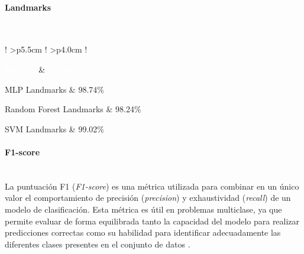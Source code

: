 	
	\paragraph{Landmarks}\mbox{}\\
	
	{
		
		\small
		\renewcommand{\arraystretch}{1.15}
		
		\begin{table}[H]
			\centering
			\caption{Comparación de exhaustividad (\textit{recall}) obtenida por los modelos evaluados utilizando landmarks extraídos mediante MediaPipe Hands.}
			\label{tab:landmarks_recall}
			
			\begin{tabular}{
					!{\vrule width 0.6pt}
					>{\centering\arraybackslash}p{5.5cm}
					!{\vrule width 0.6pt}
					>{\centering\arraybackslash}p{4.0cm}
					!{\vrule width 0.6pt}
				}
				\hline
				
				\textcolor{white}{\textbf{Modelo}} &
				\textcolor{white}{\textbf{Recall}} \\
				
				\hline
				
				MLP Landmarks &
				98.74\% \\
				\hline
				
				Random Forest Landmarks &
				98.24\% \\
				\hline
				
				SVM Landmarks &
				99.02\% \\
				\hline
				
			\end{tabular}
		\end{table}
	}
	
	\paragraph{F1-score}\mbox{}\\
	
	La puntuación F1 (\textit{F1-score}) es una métrica utilizada para combinar en un único valor el comportamiento de precisión (\textit{precision}) y exhaustividad (\textit{recall}) de un modelo de clasificación. Esta métrica es útil en problemas multiclase, ya que permite evaluar de forma equilibrada tanto la capacidad del modelo para realizar predicciones correctas como su habilidad para identificar adecuadamente las diferentes clases presentes en el conjunto de datos \cite{goodfellow2016deep,geron2022hands}.
	
